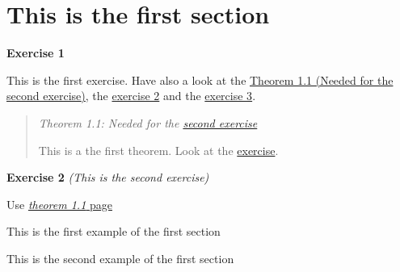 \ifdef{\mainmatter}{}{\listofexample
\listofexercise
\listoftheorem}

\section{This is the first section}\label{this-is-the-first-section}

\label{exercise:1}{\textbf{Exercise
1}}

This is the first exercise. Have also a look at the
\hyperref[theorem:first]{{Theorem 1.1 (Needed for the
\hyperref[exercise:second]{second exercise})}}, the
\hyperref[exercise:second]{{exercise 2}} and the
\hyperref[exercise:last]{{exercise 3}}.

\begin{quote}
\label{theorem:this-is-the-first-section.needed-for-the-second-exercise}{}\label{theorem:first}{\emph{Theorem
1.1: Needed for the \hyperref[exercise:second]{second exercise}}}

This is a the first theorem. Look at the
\hyperref[exercise:second]{exercise}.
\end{quote}

\label{exercise:this-is-the-second-exercise}{}\label{exercise:second}{\textbf{Exercise
2} \emph{(This is the second exercise)}}

Use \hyperref[theorem:first]{\emph{theorem 1.1} page
\pageref{theorem:first}}

\begin{description}
\tightlist
\item[\phantomsection\addcontentsline{example}{example}{\protect\numberline {1.1}{\ignorespaces {Example}}}\phantomsection\label{example:this-is-the-first-section.1}{}\phantomsection\label{example:1.1}{\textbf{Example
1}}]
This is the first example of the first section
\item[\phantomsection\addcontentsline{example}{example}{\protect\numberline {1.2}{\ignorespaces {Example}}}\phantomsection\label{example:this-is-the-first-section.2}{}\phantomsection\label{example:1.2}{\textbf{Example
2}}]
This is the second example of the first section
\end{description}

